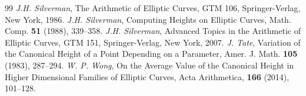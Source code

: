 \documentclass[12pt,reqno]{amsart}
\begin{document}
\begin{thebibliography}{99}
\textit{J.H. Silverman}, The Arithmetic of Elliptic Curves, GTM 106, Springer-Verlag, New York, 1986.
\textit{J.H. Silverman}, Computing Heights on Elliptic Curves, Math. Comp. \textbf{51} (1988), 339--358.
\textit{J.H. Silverman}, Advanced Topics in the Arithmetic of Elliptic Curves, GTM 151, Springer-Verlag, New York, 2007.
\textit{J. Tate}, Variation of the Canonical Height of a Point Depending on a Parameter, Amer. J. Math. \textbf{105} (1983), 287--294.
\textit{W. P. Wong}, On the Average Value of the Canonical Height in Higher Dimensional Families of Elliptic Curves, Acta Arithmetica, \textbf{166} (2014), 101--128.
\end{thebibliography}
\end{document}
